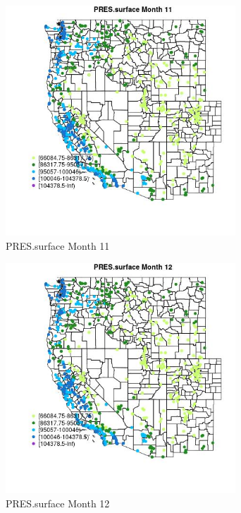 \begin{figure} 
\centering  
\includegraphics[width=0.77\textwidth]{Code_Outputs/Report_ML_input_PM25_Step4_part_f_de_duplicated_aveswNAs_MapObsMo11PRESsurface.jpg} 
\caption{\label{fig:Report_ML_input_PM25_Step4_part_f_de_duplicated_aveswNAsMapObsMo11PRESsurface}PRES.surface Month 11} 
\end{figure} 
 

\begin{figure} 
\centering  
\includegraphics[width=0.77\textwidth]{Code_Outputs/Report_ML_input_PM25_Step4_part_f_de_duplicated_aveswNAs_MapObsMo12PRESsurface.jpg} 
\caption{\label{fig:Report_ML_input_PM25_Step4_part_f_de_duplicated_aveswNAsMapObsMo12PRESsurface}PRES.surface Month 12} 
\end{figure} 
 

